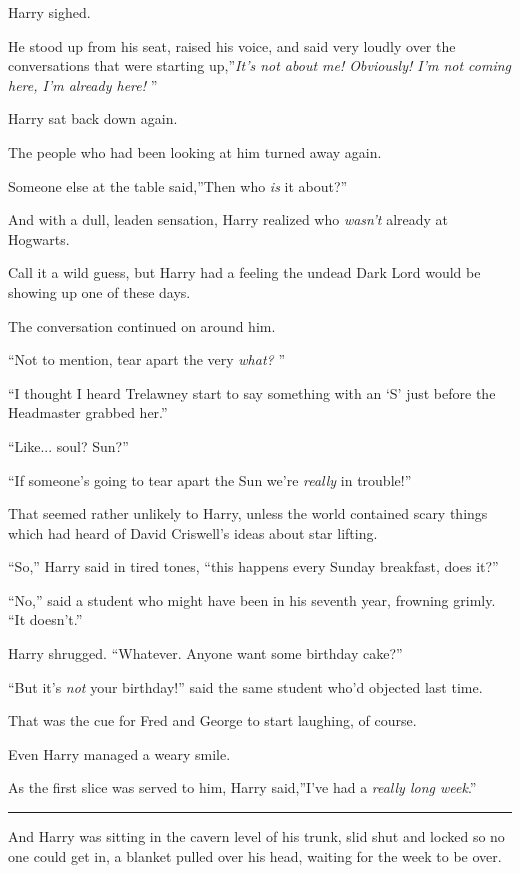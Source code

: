 Harry sighed.

He stood up from his seat, raised his voice, and said very loudly over
the conversations that were starting up,''\emph{It's not about me!
Obviously! I'm not coming here, I'm already here!} ''

Harry sat back down again.

The people who had been looking at him turned away again.

Someone else at the table said,''Then who \emph{is} it about?''

And with a dull, leaden sensation, Harry realized who \emph{wasn't}
already at Hogwarts.

Call it a wild guess, but Harry had a feeling the undead Dark Lord would
be showing up one of these days.

The conversation continued on around him.

``Not to mention, tear apart the very \emph{what?} ''

``I thought I heard Trelawney start to say something with an `S' just
before the Headmaster grabbed her.''

``Like... soul? Sun?''

``If someone's going to tear apart the Sun we're \emph{really} in
trouble!''

That seemed rather unlikely to Harry, unless the world contained scary
things which had heard of David Criswell's ideas about star lifting.

``So,'' Harry said in tired tones, ``this happens every Sunday
breakfast, does it?''

``No,'' said a student who might have been in his seventh year, frowning
grimly. ``It doesn't.''

Harry shrugged. ``Whatever. Anyone want some birthday cake?''

``But it's \emph{not} your birthday!'' said the same student who'd
objected last time.

That was the cue for Fred and George to start laughing, of course.

Even Harry managed a weary smile.

As the first slice was served to him, Harry said,''I've had a
\emph{really long week}.''

\begin{center}\rule{3in}{0.4pt}\end{center}

And Harry was sitting in the cavern level of his trunk, slid shut and
locked so no one could get in, a blanket pulled over his head, waiting
for the week to be over.

